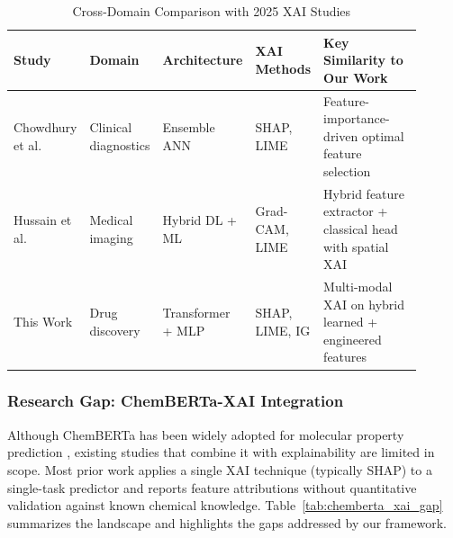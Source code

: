 \documentclass[preprint,12pt]{elsarticle}
\begin{document}
\begin{table}[H]
\centering
\caption{Cross-Domain Comparison with 2025 XAI Studies}
\label{tab:cross_domain_xai}
\small
\begin{tabular}{p{0.18\linewidth} p{0.14\linewidth} p{0.16\linewidth} p{0.16\linewidth} p{0.26\linewidth}}
\toprule
\textbf{Study} & \textbf{Domain} & \textbf{Architecture} & \textbf{XAI Methods} & \textbf{Key Similarity to Our Work} \\
\midrule
Chowdhury et al.\ \cite{chowdhury2025ensemble} & Clinical diagnostics & Ensemble ANN & SHAP, LIME & Feature-importance-driven optimal feature selection \\
Hussain et al.\ \cite{hussain2025neuroblend} & Medical imaging & Hybrid DL + ML & Grad-CAM, LIME & Hybrid feature extractor + classical head with spatial XAI \\
This Work & Drug discovery & Transformer + MLP & SHAP, LIME, IG & Multi-modal XAI on hybrid learned + engineered features \\
\bottomrule
\end{tabular}
\end{table}

\subsubsection*{Research Gap: ChemBERTa-XAI Integration}

Although ChemBERTa has been widely adopted for molecular property prediction \cite{chithrananda2020chemberta}, existing studies that combine it with explainability are limited in scope. Most prior work applies a single XAI technique (typically SHAP) to a single-task predictor and reports feature attributions without quantitative validation against known chemical knowledge. Table~\ref{tab:chemberta_xai_gap} summarizes the landscape and highlights the gaps addressed by our framework.
\end{document}

